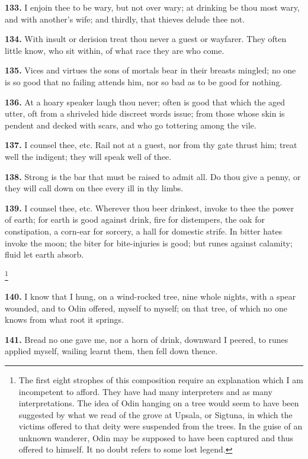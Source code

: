 \textbf{133.} I enjoin thee to be wary, but not over wary; at drinking be
thou most wary, and with another's wife; and thirdly, that thieves
delude thee not.

\textbf{134.} With insult or derision treat thou never a guest or wayfarer.
They often little know, who sit within, of what race they are who
come.

\textbf{135.} Vices and virtues the sons of mortals bear in their breasts
mingled; no one is so good that no failing attends him, nor so bad as
to be good for nothing.

\textbf{136.} At a hoary speaker laugh thou never; often is good that which
the aged utter, oft from a shriveled hide discreet words issue; from
those whose skin is pendent and decked with scars, and who go
tottering among the vile.

\textbf{137.} I counsel thee, etc. Rail not at a guest, nor from thy gate
thrust him; treat well the indigent; they will speak well of thee.

\textbf{138.} Strong is the bar that must be raised to admit all. Do thou
give a penny, or they will call down on thee every ill in thy limbs.

\textbf{139.} I counsel thee, etc. Wherever thou beer drinkest, invoke to
thee the power of earth; for earth is good against drink, fire for
distempers, the oak for constipation, a corn-ear for sorcery, a hall
for domestic strife. In bitter hates invoke the moon; the biter for
bite-injuries is good; but runes against calamity; fluid let earth
absorb.


\footnote{The first eight strophes of this composition require an
explanation which I am incompetent to afford. They have had many
interpreters and as many interpretations. The idea of Odin hanging on
a tree would seem to have been suggested by what we read of the grove
at Upsala, or Sigtuna, in which the victims offered to that deity were
suspended from the trees. In the guise of an unknown wanderer, Odin
may be supposed to have been captured and thus offered to himself. It
no doubt refers to some lost legend.}

\textbf{140.} I know that I hung, on a wind-rocked tree, nine whole nights,
with a spear wounded, and to Odin offered, myself to myself; on that
tree, of which no one knows from what root it springs.

\textbf{141.} Bread no one gave me, nor a horn of drink, downward I peered,
to runes applied myself, wailing learnt them, then fell down thence.

